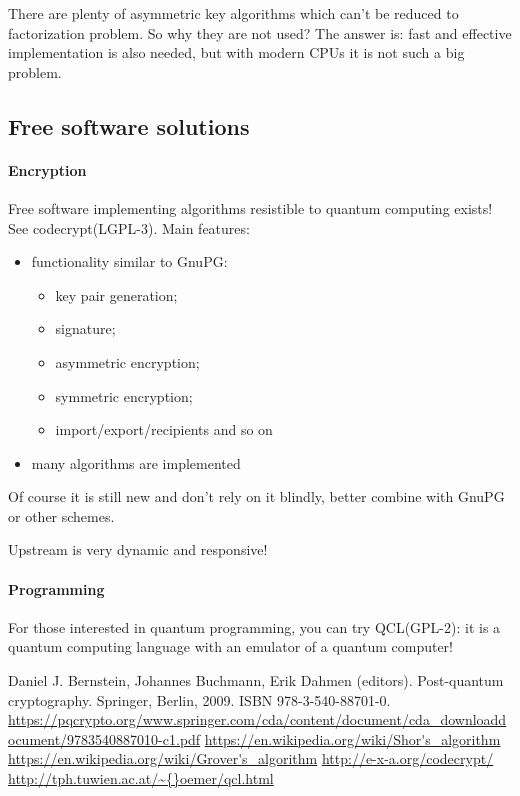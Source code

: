 \documentclass[10pt, a5paper]{article}
\begin{document}
There are plenty of asymmetric key algorithms which can't be \linebreak reduced to factorization problem. So why they are not used? The answer is: fast and effective implementation is also needed, but with modern CPUs it is not such a big problem.

\subsection*{Free software solutions}

\paragraph{Encryption}

Free software implementing algorithms resistible to \linebreak quantum computing exists! See codecrypt\footnotemark[4] (LGPL-3). Main features:

\begin{itemize}
  \item functionality similar to GnuPG:\begin{itemize}
  \item key pair generation;
  \item signature;
  \item asymmetric encryption;
  \item symmetric encryption;
  \item import/export/recipients and so on
\end{itemize}


  \item many algorithms are implemented
\end{itemize}

Of course it is still new and don't rely on it blindly, better combine with GnuPG or other schemes.

Upstream is very dynamic and responsive!

\paragraph{Programming}

For those interested in quantum programming, you can try QCL\footnotemark[5] (GPL-2): it is a quantum computing language with an emulator of a quantum computer!

\begin{thebibliography}{99}
Daniel J. Bernstein, Johannes Buchmann, Erik Dahmen (editors). Post-quantum cryptography. Springer, Berlin, 2009. ISBN 978-3-540-88701-0. \url{https://pqcrypto.org/www.springer.com/cda/content/document/cda\_downloaddocument/9783540887010-c1.pdf}
\url{https://en.wikipedia.org/wiki/Shor's\_algorithm}
\url{https://en.wikipedia.org/wiki/Grover's\_algorithm}
\url{http://e-x-a.org/codecrypt/}
\url{http://tph.tuwien.ac.at/\~{}oemer/qcl.html}
\end{thebibliography}
\end{document}
